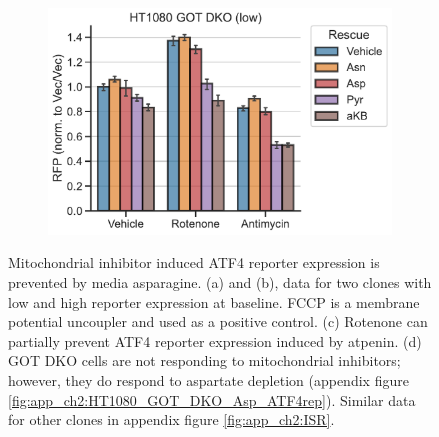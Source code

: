 \begin{figure}
\begin{subfigure}[b]{0.4\textwidth}
         \caption{}
         \label{fig:ch2:143B_Atp_ATF4rep}
     \end{subfigure}
     \hspace{0.06\textwidth}
     \begin{subfigure}[b]{0.4\textwidth}
         \includegraphics[width=\textwidth]{figures/chap2/HT1080_GOT_DKO_ETCinhib_ATF4rep.pdf}
         \caption{}
         \label{fig:ch2:HT1080_GOT_DKO_ETCinhib_ATF4rep}
     \end{subfigure}
        \caption[Mitochondrial inhibitor induced ATF4 is rescued by Asn.]{
        Mitochondrial inhibitor induced ATF4 reporter expression is prevented by media asparagine.
        (a) and (b), data for two clones with low and high reporter expression at baseline.
        FCCP is a membrane potential uncoupler and used as a positive control.
        (c) Rotenone can partially prevent ATF4 reporter expression induced by atpenin.
        (d) GOT DKO cells are not responding to mitochondrial inhibitors; however, they do respond to aspartate depletion (appendix figure \ref{fig:app_ch2:HT1080_GOT_DKO_Asp_ATF4rep}).
        Similar data for other clones in appendix figure \ref{fig:app_ch2:ISR}.
        }
        \label{fig:ch2:ISR}
\end{figure}


